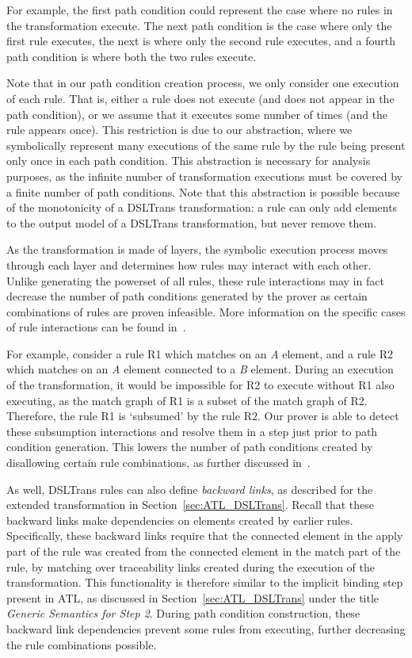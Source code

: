 For example, the first path
condition could represent the case where no rules in the transformation execute.
The next path condition is the case where only the first rule executes, the next
is where only the second rule executes, and a fourth path condition is where
both the two rules execute.

Note that in our path condition creation process, we
only consider one execution of each rule. That is, either a rule does not
execute (and does not appear in the path condition), or we assume that it executes some number of times (and the rule appears once). This restriction is due to our abstraction, where we symbolically represent
many executions of the same rule by the rule being present only once in each path
condition. This abstraction is necessary for analysis purposes, as the infinite number of transformation executions must be covered by a finite number of path conditions. Note that this abstraction is possible because of the
monotonicity of a DSLTrans transformation: a rule can only add elements to the
output model of a DSLTrans transformation, but never remove them.

As the transformation is made of layers, the symbolic execution process moves
through each layer and determines how rules may interact with each other. Unlike generating the powerset of all rules, these
rule interactions may in fact decrease the number of path conditions generated
by the prover as certain combinations of rules are proven infeasible. More information on the specific cases of rule interactions can be found in~\cite{Oakes2016}.

For example, consider a rule R1 which matches on an \textit{A} element, and a
rule R2 which matches on an \textit{A} element connected to a \textit{B}
element. During an execution of the transformation, it would be impossible for R2 to execute without R1 also executing, as the match graph of R1 is a subset of the match graph of R2. Therefore, the rule R1 is `subsumed' by the rule R2. Our prover is able to detect these subsumption interactions and resolve them in a step just prior to path condition generation. This lowers the number of path conditions created by disallowing certain rule combinations, as further discussed in~\cite{Selim2014}.

As well, DSLTrans rules can also define \textit{backward links}, as described for the extended \FTP transformation in Section~\ref{sec:ATL_DSLTrans}. Recall that these backward links make dependencies on elements created by earlier rules. Specifically, these backward links require that the connected element in the
apply part of the rule was created from the connected element in the match part of the rule, by matching over traceability links created during the execution of the transformation. This functionality is therefore similar to the implicit binding step present in ATL, as discussed in Section~\ref{sec:ATL_DSLTrans} under the title \textit{Generic Semantics for Step 2}. During path condition construction, these backward link dependencies prevent some rules from executing, further decreasing the rule combinations possible.


